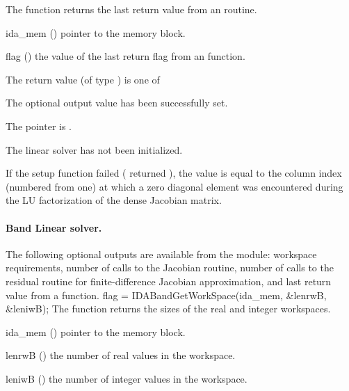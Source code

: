 {
  The function  returns the
  last return value from an {\idadense} routine. 
}
{
  \begin{args}
  \item[ida\_mem] ()
    pointer to the {\ida} memory block.
  \item[flag] ()
    the value of the last return flag from an {\idadense} function.
  \end{args}
}
{
  The return value  (of type ) is one of
  \begin{args}
  \item[\Id{IDADENSE\_SUCCESS}] 
    The optional output value has been successfully set.
  \item[\Id{IDADENSE\_MEM\_NULL}]
    The  pointer is .
  \item[\Id{IDADENSE\_LMEM\_NULL}]
    The {\idadense} linear solver has not been initialized.
  \end{args}
}
{
  If the {\idadense} setup function failed ( returned
  ), the value  is equal to the column index
  (numbered from one) at which a zero diagonal element was encountered during
  the LU factorization of the dense Jacobian matrix.
}
%
%
\noindent\paragraph{\bf Band Linear solver.}
The following optional outputs are available from the {\idaband} module:
workspace requirements, number of calls to the Jacobian routine, number of 
calls to the residual routine for finite-difference Jacobian approximation,
and last return value from a {\idaband} function.
{
  flag = IDABandGetWorkSpace(ida\_mem, \&lenrwB, \&leniwB);
}
{
  The function  returns the sizes of
  the {\idaband} real and integer workspaces.
}
{
  \begin{args}
  \item[ida\_mem] ()
    pointer to the {\ida} memory block.
  \item[lenrwB] ()
    the number of real values in the {\idaband} workspace.
  \item[leniwB] ()
    the number of integer values in the {\idaband} workspace.
  \end{args}
}
